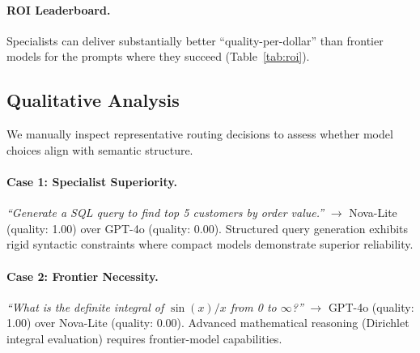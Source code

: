 \paragraph{ROI Leaderboard.} Specialists can deliver substantially better ``quality-per-dollar'' than frontier models for the prompts where they succeed (Table~\ref{tab:roi}).

\begin{table}[t]
\centering
\small
\caption{\textbf{ROI Leaderboard.} Specialists deliver substantially better value than GPT-4o in their niches.}
\label{tab:roi}
\end{table}


\subsection{Qualitative Analysis}
\label{sec:qualitative}

We manually inspect representative routing decisions to assess whether model choices align with semantic structure.

\paragraph{Case 1: Specialist Superiority.} \emph{``Generate a SQL query to find top 5 customers by order value.''} $\to$ Nova-Lite (quality: 1.00) over GPT-4o (quality: 0.00). Structured query generation exhibits rigid syntactic constraints where compact models demonstrate superior reliability.

\paragraph{Case 2: Frontier Necessity.} \emph{``What is the definite integral of $\sin(x)/x$ from 0 to $\infty$?''} $\to$ GPT-4o (quality: 1.00) over Nova-Lite (quality: 0.00). Advanced mathematical reasoning (Dirichlet integral evaluation) requires frontier-model capabilities.

